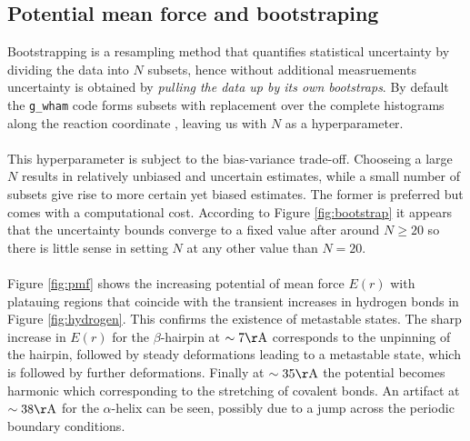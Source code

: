 \documentclass{article}[12pt]
\numberwithin{equation}{section}
\def\code#1{\texttt{#1}}
\begin{document}
\subsection{Potential mean force and bootstraping}
Bootstrapping is a resampling method that quantifies statistical uncertainty by
dividing the data into $N$ subsets, hence without additional measruements
uncertainty is obtained by \textit{pulling the data up by its own bootstraps}.
By default the \code{g\_wham} code forms subsets with replacement over the
complete histograms along the reaction coordinate \cite{gwham2010}, leaving us
with $N$ as a hyperparameter.
\\\\
This hyperparameter is subject to the bias-variance trade-off. Chooseing a large
$N$ results in relatively unbiased and uncertain estimates, while a small number
of subsets give rise to more certain yet biased estimates. The former is
preferred but comes with a computational cost. According to Figure
\ref{fig:bootstrap} it appears that the uncertainty bounds converge to a fixed
value after around $N\geq20$ so there is little sense in setting $N$ at any
other value than $N=20$.
\\\\
Figure \ref{fig:pmf} shows the increasing potential of mean force $E(r)$ with
platauing regions that coincide with the transient increases in hydrogen bonds
in Figure \ref{fig:hydrogen}. This confirms the existence of metastable states.
The sharp increase in $E(r)$ for the $\beta$-hairpin at $\sim7\mathrm{\AA}$
corresponds to the unpinning of the hairpin, followed by steady deformations
leading to a metastable state, which is followed by further deformations. Finally at
$\sim35\mathrm{\AA}$ the potential becomes harmonic which corresponding to the
stretching of covalent bonds. An artifact at $\sim38\mathrm{\AA}$ for the
$\alpha$-helix can be seen, possibly due to a jump across the periodic boundary
conditions.
\end{document}

